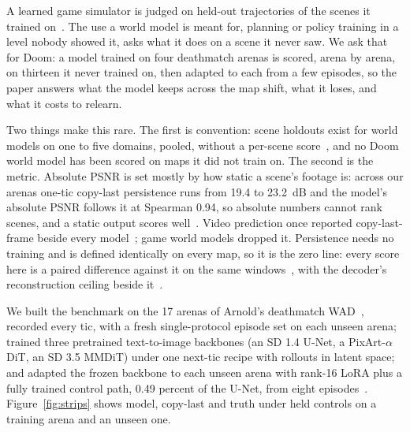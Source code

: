 A learned game simulator is judged on held-out trajectories of the scenes it trained on~\citep{valevski2024gamengen,alonso2024diamond,he2025matrixgame}. The use a world model is meant for, planning or policy training in a level nobody showed it, asks what it does on a scene it never saw. We ask that for Doom: a model trained on four deathmatch arenas is scored, arena by arena, on thirteen it never trained on, then adapted to each from a few episodes, so the paper answers what the model keeps across the map shift, what it loses, and what it costs to relearn.

Two things make this rare. The first is convention: scene holdouts exist for world models on one to five domains, pooled, without a per-scene score~\citep{chen2026xeworld,rigter2024avid,gao2025adaworld,koh2021pathdreamer}, and no Doom world model has been scored on maps it did not train on. %
The second is the metric. Absolute PSNR is set mostly by how static a scene's footage is: across our arenas one-tic copy-last persistence runs from 19.4 to 23.2~dB and the model's absolute PSNR follows it at Spearman 0.94, so absolute numbers cannot rank scenes, and a static output scores well~\citep{he2025matrixgame}. %
Video prediction once reported copy-last-frame beside every model~\citep{lotter2017prednet,villegas2019fidelity}; game world models dropped it. Persistence needs no training and is defined identically on every map, so it is the zero line: every score here is a paired difference against it on the same windows~\citep{bruce2024genie}, with the decoder's reconstruction ceiling beside it~\citep{zheng2023occworld,karypidis2024dinoforesight}.

We built the benchmark on the 17 arenas of Arnold's deathmatch WAD~\citep{lample2017playing,wydmuch2018vizdoom}, recorded every tic, with a fresh single-protocol episode set on each unseen arena; trained three pretrained text-to-image backbones (an SD 1.4 U-Net, a PixArt-$\alpha$ DiT, an SD 3.5 MMDiT) under one next-tic recipe with rollouts in latent space; and adapted the frozen backbone to each unseen arena with rank-16 LoRA plus a fully trained control path, 0.49 percent of the U-Net, from eight episodes~\citep{hu2022lora,xie2023difffit}. %
Figure~\ref{fig:strips} shows model, copy-last and truth under held controls on a training arena and an unseen one.

